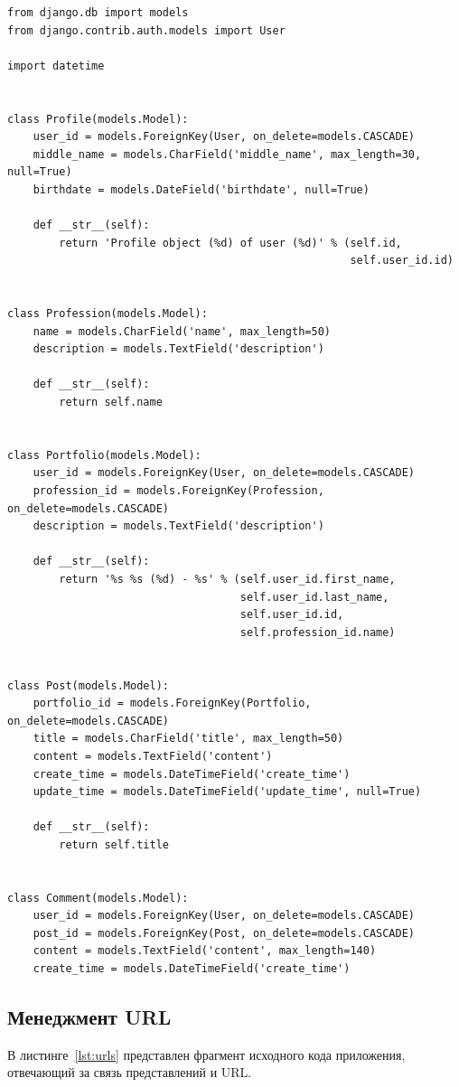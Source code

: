 \begin{lstlisting}[caption={Модели Django}, label=lst:models]
from django.db import models
from django.contrib.auth.models import User

import datetime


class Profile(models.Model):
    user_id = models.ForeignKey(User, on_delete=models.CASCADE)
    middle_name = models.CharField('middle_name', max_length=30, null=True)
    birthdate = models.DateField('birthdate', null=True)

    def __str__(self):
        return 'Profile object (%d) of user (%d)' % (self.id,
                                                     self.user_id.id)


class Profession(models.Model):
    name = models.CharField('name', max_length=50)
    description = models.TextField('description')

    def __str__(self):
        return self.name


class Portfolio(models.Model):
    user_id = models.ForeignKey(User, on_delete=models.CASCADE)
    profession_id = models.ForeignKey(Profession, on_delete=models.CASCADE)
    description = models.TextField('description')

    def __str__(self):
        return '%s %s (%d) - %s' % (self.user_id.first_name,
                                    self.user_id.last_name,
                                    self.user_id.id,
                                    self.profession_id.name)


class Post(models.Model):
    portfolio_id = models.ForeignKey(Portfolio, on_delete=models.CASCADE)
    title = models.CharField('title', max_length=50)
    content = models.TextField('content')
    create_time = models.DateTimeField('create_time')
    update_time = models.DateTimeField('update_time', null=True)

    def __str__(self):
        return self.title


class Comment(models.Model):
    user_id = models.ForeignKey(User, on_delete=models.CASCADE)
    post_id = models.ForeignKey(Post, on_delete=models.CASCADE)
    content = models.TextField('content', max_length=140)
    create_time = models.DateTimeField('create_time')
\end{lstlisting}

\subsection{Менеджмент URL}%
В листинге~\ref{lst:urls} представлен фрагмент исходного кода приложения, отвечающий за связь представлений и URL.

